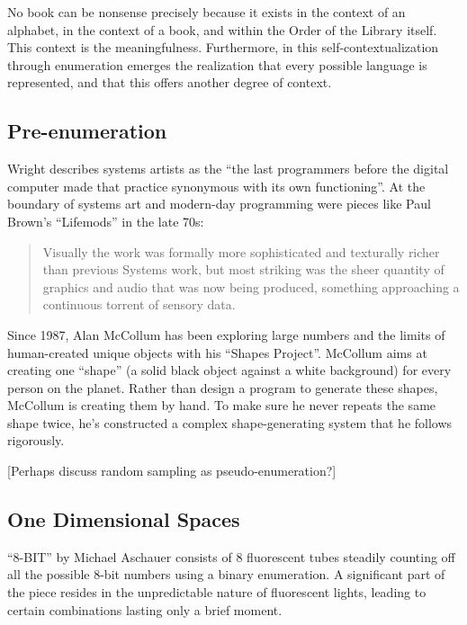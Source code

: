\documentclass{thesis}
\begin{document}
	No book can be nonsense precisely because it exists in the context of an alphabet, in the context of a book, and within the Order of the Library itself. This context is the meaningfulness. Furthermore, in this self-contextualization through enumeration emerges the realization that every possible language is represented, and that this offers another degree of context.
	
\subsection{Pre-enumeration}

	Wright\cite{Wright09} describes systems artists as the ``the last programmers before the digital computer made that practice synonymous with its own functioning''. At the boundary of systems art and modern-day programming were pieces like Paul Brown's ``Lifemods'' in the late 70s:
	
	\begin{quote}
	Visually the work was formally more sophisticated and texturally richer than previous Systems work, but most striking was the sheer quantity of graphics and audio that was now being produced, something approaching a continuous torrent of sensory data.
	\end{quote}
	
	Since 1987, Alan McCollum has been exploring large numbers and the limits of human-created unique objects with his ``Shapes Project''.\cite{allan_mccollum_shapes_2006} McCollum aims at creating one ``shape'' (a solid black object against a white background) for every person on the planet. Rather than design a program to generate these shapes, McCollum is creating them by hand. To make sure he never repeats the same shape twice, he's constructed a complex shape-generating system that he follows rigorously.
	
	[Perhaps discuss random sampling as pseudo-enumeration?]
	
\subsection{One Dimensional Spaces}

	\cite{michael_aschauer_8-bit_????}
	``8-BIT'' by Michael Aschauer consists of 8 fluorescent tubes steadily counting off all the possible 8-bit numbers using a binary enumeration. A significant part of the piece resides in the unpredictable nature of fluorescent lights, leading to certain combinations lasting only a brief moment.
	
\end{document}
